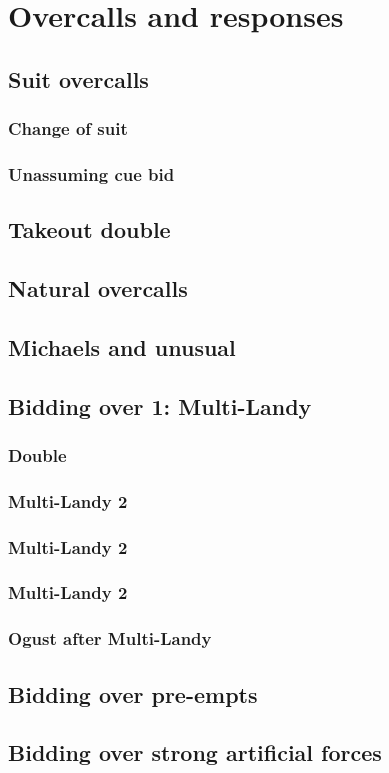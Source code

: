 \chapter{Overcalls and responses}

\section{Suit overcalls}

\subsection{Change of suit}

\subsection{Unassuming cue bid}

\section{Takeout double}

\section{Natural \bNs overcalls}

\section{Michaels and unusual \bN}

\section{Bidding over 1\bN: Multi-Landy}


\subsection{Double}

\subsection{Multi-Landy 2\bC}

\subsection{Multi-Landy 2\bD}

\subsection{Multi-Landy 2\bmaj}

\subsection{Ogust after Multi-Landy}

\section{Bidding over pre-empts}

\section{Bidding over strong artificial forces}

